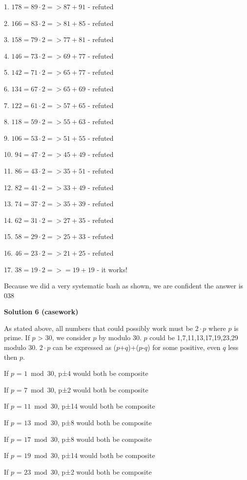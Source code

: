 \begin{enumerate}
 1. $178 = 89 \cdot 2 => 87 + 91$ - refuted

 2. $166 = 83 \cdot 2 => 81 + 85$ - refuted

 3. $158 = 79 \cdot 2 => 77 + 81$ - refuted

 4. $146 = 73 \cdot 2 => 69 + 77$ - refuted

 5. $142 = 71 \cdot 2 => 65 + 77$ - refuted

 6. $134 = 67 \cdot 2 => 65 + 69$ - refuted

 7. $122 = 61 \cdot 2 => 57 + 65$ - refuted

 8. $118 = 59 \cdot 2 => 55 + 63$ - refuted

 9. $106 = 53 \cdot 2 => 51 + 55$ - refuted

 10. $94 = 47 \cdot 2 => 45 + 49$ - refuted

 11. $86 = 43 \cdot 2 => 35 + 51$ - refuted

 12. $82 = 41 \cdot 2 => 33 + 49$ - refuted

 13. $74 = 37 \cdot 2 => 35 + 39$ - refuted

 14. $62 = 31 \cdot 2 => 27 + 35$ - refuted

 15. $58 = 29 \cdot 2 => 25 + 33$ - refuted

 16. $46 = 23 \cdot 2 => 21 + 25$ - refuted

 17. $38 = 19 \cdot 2 => = 19 + 19$ - it works!

 Because we did a very systematic bash as shown, we are confident the answer is $\boxed {038}$




\textbf{Solution 6 (casework)}

As stated above, all numbers that could possibly work must be $2 \cdot p$ where $p$ is prime. If $p$ > 30, we consider $p$ by modulo 30. $p$ could be 1,7,11,13,17,19,23,29 modulo 30. $2 \cdot p$ can be expressed as ($p$+$q$)+($p$-$q$) for some positive, even $q$ less then $p$.

 If $p$ = $1 \bmod{30}$, p±4 would both be composite

 If $p$ = $7 \bmod{30}$, p±2 would both be composite

 If $p$ = $11 \bmod{30}$, p±14 would both be composite

 If $p$ = $13 \bmod{30}$, p±8 would both be composite

 If $p$ = $17 \bmod{30}$, p±8 would both be composite

 If $p$ = $19 \bmod{30}$, p±14 would both be composite

 If $p$ = $23 \bmod{30}$, p±2 would both be composite


\end{enumerate}
